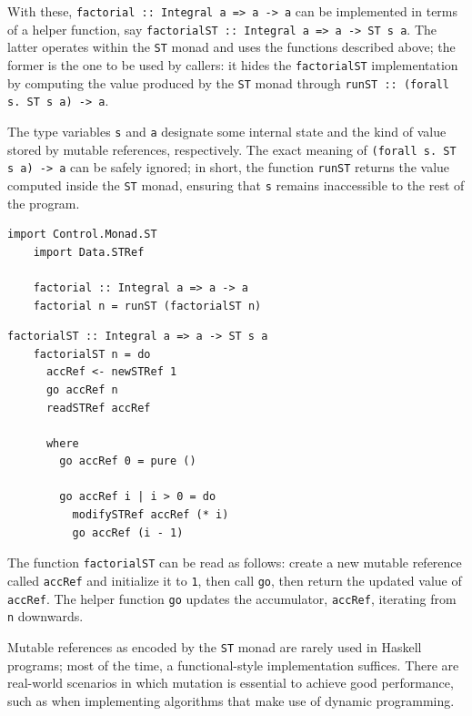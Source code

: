 \documentclass[UdineBachThesis,american,11pt]{PhdThesis}
\begin{document}
  With these, \mbox{\texttt{factorial :: Integral a => a -> a}} can be
  implemented in terms of a helper function, say
  \mbox{\texttt{factorialST :: Integral a => a -> ST s a}}. The latter operates
  within the \mbox{\texttt{ST}} monad and uses the functions described above;
  the former is the one to be used by callers: it hides the
  \mbox{\texttt{factorialST}} implementation by computing the value produced by
  the \mbox{\texttt{ST}} monad through
  \mbox{\texttt{runST :: (forall s. ST s a) -> a}}.

  The type variables \texttt{s} and \texttt{a} designate some internal state and
  the kind of value stored by mutable references, respectively. The exact
  meaning of \mbox{\texttt{(forall s. ST s a) -> a}} can be safely ignored; in
  short, the function \mbox{\texttt{runST}} returns the value computed inside
  the \mbox{\texttt{ST}} monad, ensuring that \texttt{s} remains inaccessible to
  the rest of the program.

  \begin{Verbatim}[gobble=4,fontsize=\small]
    import Control.Monad.ST
    import Data.STRef

    factorial :: Integral a => a -> a
    factorial n = runST (factorialST n)
  \end{Verbatim}

  \pagebreak

  \begin{Verbatim}[gobble=4,fontsize=\small]
    factorialST :: Integral a => a -> ST s a
    factorialST n = do
      accRef <- newSTRef 1
      go accRef n
      readSTRef accRef

      where
        go accRef 0 = pure ()

        go accRef i | i > 0 = do
          modifySTRef accRef (* i)
          go accRef (i - 1)
  \end{Verbatim}

  The function \mbox{\texttt{factorialST}} can be read as follows: create a new
  mutable reference called \mbox{\texttt{accRef}} and initialize it to
  \texttt{1}, then call \mbox{\texttt{go}}, then return the updated value of
  \mbox{\texttt{accRef}}. The helper function \mbox{\texttt{go}} updates the
  accumulator, \mbox{\texttt{accRef}}, iterating from \texttt{n} downwards.

  Mutable references as encoded by the \mbox{\texttt{ST}} monad are rarely used
  in Haskell programs; most of the time, a functional-style implementation
  suffices. There are real-world scenarios in which mutation is essential to
  achieve good performance, such as when implementing algorithms that make use
  of dynamic programming.
\end{document}
